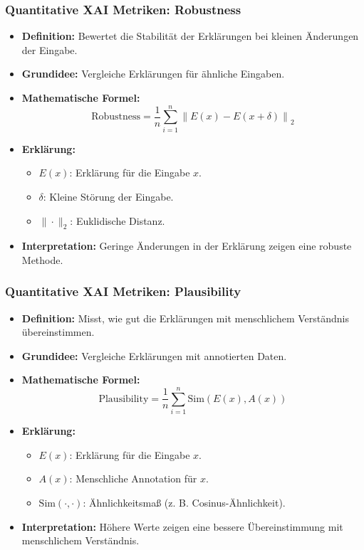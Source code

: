 \documentclass[aspectratio=1610, xcolor=dvipsnames, 9pt]{beamer}
\begin{document}
\begin{frame}
  \frametitle{Quantitative XAI Metriken: Robustness}
  \begin{itemize}
    \item \textbf{Definition:} Bewertet die Stabilität der Erklärungen bei kleinen Änderungen der Eingabe.
    \item \textbf{Grundidee:} Vergleiche Erklärungen für ähnliche Eingaben.
    \item \textbf{Mathematische Formel:}
    \[
    \text{Robustness} = \frac{1}{n} \sum_{i=1}^n \left\| E(x) - E(x + \delta) \right\|_2
    \]
    \item \textbf{Erklärung:}
    \begin{itemize}
      \item $E(x)$: Erklärung für die Eingabe $x$.
      \item $\delta$: Kleine Störung der Eingabe.
      \item $\|\cdot\|_2$: Euklidische Distanz.
    \end{itemize}
    \item \textbf{Interpretation:} Geringe Änderungen in der Erklärung zeigen eine robuste Methode.
  \end{itemize}
\end{frame}

\begin{frame}
  \frametitle{Quantitative XAI Metriken: Plausibility}
  \begin{itemize}
    \item \textbf{Definition:} Misst, wie gut die Erklärungen mit menschlichem Verständnis übereinstimmen.
    \item \textbf{Grundidee:} Vergleiche Erklärungen mit annotierten Daten.
    \item \textbf{Mathematische Formel:}
    \[
    \text{Plausibility} = \frac{1}{n} \sum_{i=1}^n \text{Sim}(E(x), A(x))
    \]
    \item \textbf{Erklärung:}
    \begin{itemize}
      \item $E(x)$: Erklärung für die Eingabe $x$.
      \item $A(x)$: Menschliche Annotation für $x$.
      \item $\text{Sim}(\cdot, \cdot)$: Ähnlichkeitsmaß (z. B. Cosinus-Ähnlichkeit).
    \end{itemize}
    \item \textbf{Interpretation:} Höhere Werte zeigen eine bessere Übereinstimmung mit menschlichem Verständnis.
  \end{itemize}
\end{frame}
\end{document}
